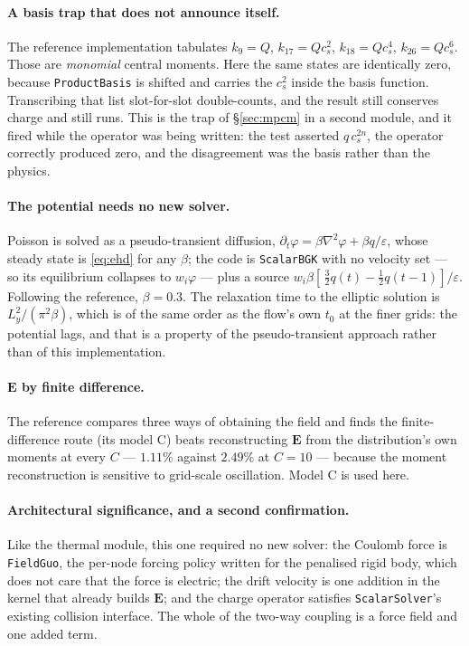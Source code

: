 \documentclass[11pt,a4paper]{article}
\newcommand{\code}[1]{\texttt{\small #1}}
\newcommand{\cs}{c_s}
\begin{document}
\paragraph{A basis trap that does not announce itself.}
The reference implementation tabulates $k_9=Q$, $k_{17}=Q\cs^2$,
$k_{18}=Q\cs^4$, $k_{26}=Q\cs^6$. Those are \emph{monomial} central moments.
Here the same states are identically zero, because \code{ProductBasis} is
shifted and carries the $\cs^2$ inside the basis function. Transcribing that
list slot-for-slot double-counts, and the result still conserves charge and
still runs. This is the trap of \S\ref{sec:mpcm} in a second module, and it
fired while the operator was being written: the test asserted $q\,\cs^{2n}$, the
operator correctly produced zero, and the disagreement was the basis rather than
the physics.

\paragraph{The potential needs no new solver.} Poisson is solved as a
pseudo-transient diffusion, $\partial_t\varphi = \beta\nabla^2\varphi +
\beta q/\varepsilon$, whose steady state is \eqref{eq:ehd} for any $\beta$; the
code is \code{ScalarBGK} with no velocity set --- so its equilibrium collapses
to $w_i\varphi$ --- plus a source $w_i\beta[\,\tfrac32 q(t) -
\tfrac12 q(t-1)]/\varepsilon$. Following the reference, $\beta=0.3$. The
relaxation time to the elliptic solution is $L_y^2/(\pi^2\beta)$, which is of
the same order as the flow's own $t_0$ at the finer grids: the potential lags,
and that is a property of the pseudo-transient approach rather than of this
implementation.

\paragraph{$\bm{E}$ by finite difference.} The reference compares three ways of
obtaining the field and finds the finite-difference route (its model C) beats
reconstructing $\bm{E}$ from the distribution's own moments at every $C$ ---
$1.11\%$ against $2.49\%$ at $C=10$ --- because the moment reconstruction is
sensitive to grid-scale oscillation. Model C is used here.

\paragraph{Architectural significance, and a second confirmation.} Like the
thermal module, this one required no new solver: the Coulomb force is
\code{FieldGuo}, the per-node forcing policy written for the penalised rigid
body, which does not care that the force is electric; the drift velocity is one
addition in the kernel that already builds $\bm{E}$; and the charge operator
satisfies \code{ScalarSolver}'s existing collision interface. The whole of the
two-way coupling is a force field and one added term.
\end{document}
